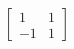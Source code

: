 \documentclass[preview]{standalone}
\begin{document}
\begin{align*}
\begin{bmatrix} 1 & 1 \\ -1 & 1 \end{bmatrix}
\end{align*}
\end{document}
